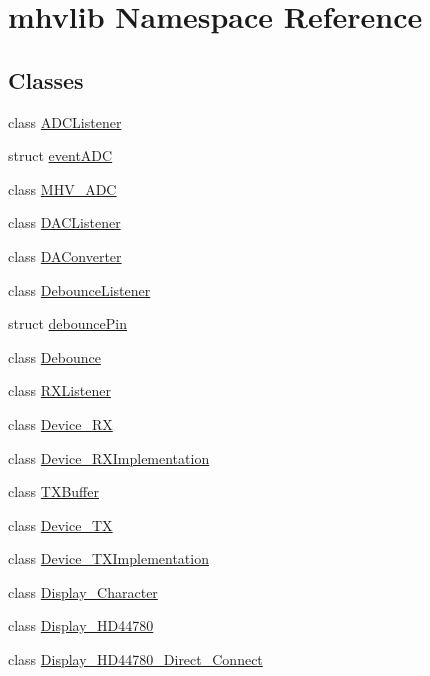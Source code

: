 \hypertarget{namespacemhvlib}{\section{mhvlib Namespace Reference}
\label{namespacemhvlib}
}
\subsection*{Classes}
\begin{DoxyCompactItemize}
\item 
class \hyperlink{classmhvlib_1_1_a_d_c_listener}{A\-D\-C\-Listener}
\item 
struct \hyperlink{structmhvlib_1_1event_a_d_c}{event\-A\-D\-C}
\item 
class \hyperlink{classmhvlib_1_1_m_h_v___a_d_c}{M\-H\-V\-\_\-\-A\-D\-C}
\item 
class \hyperlink{classmhvlib_1_1_d_a_c_listener}{D\-A\-C\-Listener}
\item 
class \hyperlink{classmhvlib_1_1_d_a_converter}{D\-A\-Converter}
\item 
class \hyperlink{classmhvlib_1_1_debounce_listener}{Debounce\-Listener}
\item 
struct \hyperlink{structmhvlib_1_1debounce_pin}{debounce\-Pin}
\item 
class \hyperlink{classmhvlib_1_1_debounce}{Debounce}
\item 
class \hyperlink{classmhvlib_1_1_r_x_listener}{R\-X\-Listener}
\item 
class \hyperlink{classmhvlib_1_1_device___r_x}{Device\-\_\-\-R\-X}
\item 
class \hyperlink{classmhvlib_1_1_device___r_x_implementation}{Device\-\_\-\-R\-X\-Implementation}
\item 
class \hyperlink{classmhvlib_1_1_t_x_buffer}{T\-X\-Buffer}
\item 
class \hyperlink{classmhvlib_1_1_device___t_x}{Device\-\_\-\-T\-X}
\item 
class \hyperlink{classmhvlib_1_1_device___t_x_implementation}{Device\-\_\-\-T\-X\-Implementation}
\item 
class \hyperlink{classmhvlib_1_1_display___character}{Display\-\_\-\-Character}
\item 
class \hyperlink{classmhvlib_1_1_display___h_d44780}{Display\-\_\-\-H\-D44780}
\item 
class \hyperlink{classmhvlib_1_1_display___h_d44780___direct___connect}{Display\-\_\-\-H\-D44780\-\_\-\-Direct\-\_\-\-Connect}
\item 

\end{DoxyCompactItemize}
